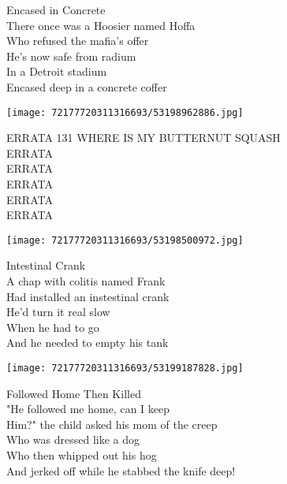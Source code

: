 \documentclass[10pt,letterpaper]{article}
\begin{document}
\begin{center}
Encased in Concrete\\
\vskip 0.2in
There once was a Hoosier named Hoffa\\
Who refused the mafia's offer\\
He's now safe from radium\\
In a Detroit stadium\\
Encased deep in a concrete coffer\\
\end{center}
\pagebreak

\begin{center}
\texttt{[image: 72177720311316693/53198962886.jpg]}
\end{center}

\begin{center}
ERRATA 131 WHERE IS MY BUTTERNUT SQUASH\\
\vskip 0.2in
ERRATA\\
ERRATA\\
ERRATA\\
ERRATA\\
ERRATA\\
\end{center}
\pagebreak

\begin{center}\texttt{[image: 72177720311316693/53198500972.jpg]}
\end{center}
\begin{center}
Intestinal Crank\\
\vskip 0.2in
A chap with colitis named Frank\\
Had installed an instestinal crank\\
He'd turn it real slow\\
When he had to go\\
And he needed to empty his tank\\
\end{center}
\pagebreak

\begin{center}\texttt{[image: 72177720311316693/53199187828.jpg]}
\end{center}
\begin{center}
Followed Home Then Killed\\
\vskip 0.2in
"He followed me home, can I keep\\
Him?" the child asked his mom of the creep\\
Who was dressed like a dog\\
Who then whipped out his hog\\
And jerked off while he stabbed the knife deep!\\
\end{center}
\pagebreak
\end{document}
